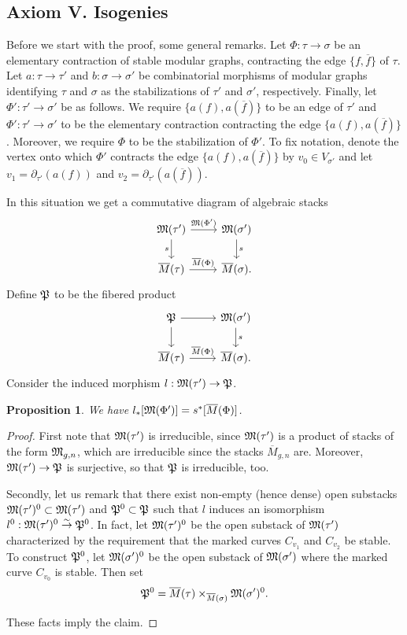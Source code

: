 \documentclass{article}
\newtheorem{prop}{Proposition}
\newcommand{\upst}{^{\ast}}
\newcommand{\lst}{_{\ast}}
\newcommand{\PP}{{\frak P}}
\newcommand{\MM}{{\frak M}}
\newcommand{\del}{\partial}
\newcommand{\ol}{\overline}
\newcommand{\ldiag}[1]%
       {\makebox[0cm]{${\scriptstyle#1}\downarrow\phantom{\scriptstyle#1}$}}
\newcommand{\rdiag}[1]%
       {\makebox[0cm]{$\phantom{\scriptstyle#1}\downarrow{\scriptstyle#1}$}}
\newcommand{\iso}{\stackrel{\sim}{\rightarrow}}
\newcommand{\comdia}[9]{%
\begin{array}{ccc}
#1 & \stackrel{#2}{\longrightarrow} & #3 \\
\ldiag{#4} & #5 & \rdiag{#6} \\
#7 & \stackrel{#8}{\longrightarrow} & #9
\end{array}}
\begin{document}
\subsection{{\sc Axiom V.} Isogenies}

Before we start with the proof, some general remarks. Let
$\Phi:\tau\to\sigma$ be an elementary contraction of stable modular
graphs, contracting the edge $\{f,\ol{f}\}$ of $\tau$.  Let
$a:\tau\rightarrow\tau'$ and $b:\sigma\rightarrow\sigma'$ be
combinatorial morphisms of modular graphs identifying $\tau$ and
$\sigma$ as the stabilizations of $\tau'$ and $\sigma'$, respectively.
Finally, let $\Phi':\tau'\to\sigma'$ be as follows. We require
$\{a(f),a(\ol{f})\}$ to be an edge of $\tau'$ and
$\Phi':\tau'\to\sigma'$ to be the elementary contraction contracting
the edge $\{a(f),a(\ol{f})\}$. Moreover, we require $\Phi$ to be the
stabilization of $\Phi'$. To fix notation, denote the vertex onto
which $\Phi'$ contracts the edge $\{a(f),a(\ol{f})\}$ by $v_0\in
V_{\sigma'}$ and let $v_1=\del_{\tau'}(a(f))$ and
$v_2=\del_{\tau'}(a(\ol{f}))$.

In this situation we get a commutative diagram of algebraic stacks
\[\begin{tikzcd}
  \MM(\tau') \dar["s"'] \rar["\MM(\Phi')"]
  & \MM(\sigma') \dar["s"] \\
  \ol{M}(\tau) \rar["\ol{M}(\Phi)"]
  & \ol{M}(\sigma).
\end{tikzcd}\]
Define $\PP$ to be the fibered product
\[\begin{tikzcd}
  \PP \dar \rar
  & \MM(\sigma') \dar["s"] \\
  \ol{M}(\tau) \rar["\ol{M}(\Phi)"]
  & \ol{M}(\sigma).
\end{tikzcd}\]
Consider the induced morphism $l:\MM(\tau')\to\PP$.

\begin{prop} \label{evfa}
We have $l\lst[\MM(\Phi')]=s\upst[\ol{M}(\Phi)]$.
\end{prop}
\begin{proof}
First note that $\MM(\tau')$ is irreducible, since $\MM(\tau')$ is a
product of stacks of the form $\MM_{g,n}$, which are irreducible since
the stacks $\ol{M}_{g,n}$ are. Moreover, $\MM(\tau')\to\PP$ is
surjective, so that $\PP$ is irreducible, too.

Secondly, let us remark that there exist non-empty (hence dense) open
substacks $\MM(\tau')^0\subset\MM(\tau')$ and $\PP^0\subset\PP$ such
that $l$ induces an isomorphism $l^0:\MM(\tau')^0\iso\PP^0$. In fact,
let $\MM(\tau')^0$ be the open substack of $\MM(\tau')$ characterized
by the requirement that the marked curves $C_{v_1}$ and $C_{v_2}$ be
stable. To construct $\PP^0$, let $\MM(\sigma')^0$ be the open
substack of $\MM(\sigma')$ where the marked curve $C_{v_0}$ is stable.
Then set $$\PP^0=\ol{M}(\tau)\times_{\ol{M}(\sigma)}\MM(\sigma')^0.$$

These facts imply the claim.
\end{proof}
\end{document}
